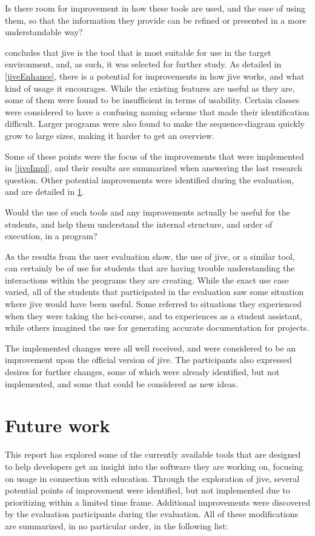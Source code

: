 \begin{theorem}
Is there room for improvement in how these tools are used, and the ease of using them, so that the information they provide can be refined or presented in a more understandable way?
\end{theorem}
 concludes that \gls{jive} is the tool that is most suitable for use in the target environment, and, as such, it was selected for further study.
As detailed in \cref{jiveEnhance}, there is a potential for improvements in how \gls{jive} works, and what kind of usage it encourages.
While the existing features are useful as they are, some of them were found to be insufficient in terms of usability.
Certain classes were considered to have a confusing naming scheme that made their identification difficult.
Larger programs were also found to make the sequence-diagram quickly grow to large sizes, making it harder to get an overview.

Some of these points were the focus of the improvements that were implemented in \cref{jiveImpl}, and their results are summarized when answering the last research question.
Other potential improvements were identified during the evaluation, and are detailed in \cref{conclusionFuture}.

\begin{theorem}
Would the use of such tools and any improvements actually be useful for the students, and help them understand the internal structure, and order of execution, in a program?
\end{theorem}
As the results from the user evaluation show, the use of \gls{jive}, or a similar tool, can certainly be of use for students that are having trouble understanding the interactions within the programs they are creating.
While the exact use case varied, all of the students that participated in the evaluation saw some situation where \gls{jive} would have been useful.
Some referred to situations they experienced when they were taking the \gls{hci}-course, and to experiences as a student assistant, while others imagined the use for generating accurate documentation for projects.

The implemented changes were all well received, and were considered to be an improvement upon the official version of \gls{jive}.
The participants also expressed desires for further changes, some of which were already identified, but not implemented, and some that could be considered as new ideas.

\section{Future work}\label{conclusionFuture}
This report has explored some of the currently available tools that are designed to help developers get an insight into the software they are working on, focusing on usage in connection with education.
Through the exploration of \gls{jive}, several potential points of improvement were identified, but not implemented due to prioritizing within a limited time frame.
Additional improvements were discovered by the evaluation participants during the evaluation.
All of these modifications are summarized, in no particular order, in the following list:

